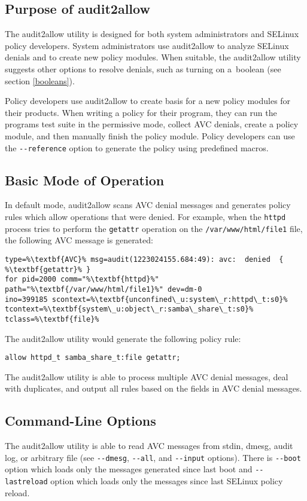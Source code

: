 \subsection{Purpose of audit2allow}
The audit2allow utility is designed for both system administrators and SELinux
policy developers. System administrators use audit2allow to analyze SELinux
denials and to create new policy modules. When suitable, the audit2allow utility
suggests other options to resolve denials, such as turning on a~boolean (see
section \ref{booleans}).

Policy developers use audit2allow to create basis for a new policy modules for
their products. When writing a policy for their program, they can run the
programs test suite in the permissive mode, collect AVC denials, create a policy
module, and then manually finish the policy module. Policy developers can use
the \texttt{-{}-reference} option to generate the policy using predefined
macros.

\subsection{Basic Mode of Operation}
In default mode, audit2allow scans AVC denial messages and generates policy
rules which allow operations that were denied. For example, when the
\texttt{httpd} process tries to perform the \texttt{getattr} operation on the
\texttt{/var/www/html/file1} file, the following AVC message is generated:
\begin{lstlisting}[escapechar=\%]
type=%\textbf{AVC}% msg=audit(1223024155.684:49): avc:  denied  { %\textbf{getattr}% }
for pid=2000 comm="%\textbf{httpd}%" path="%\textbf{/var/www/html/file1}%" dev=dm-0
ino=399185 scontext=%\textbf{unconfined\_u:system\_r:httpd\_t:s0}%
tcontext=%\textbf{system\_u:object\_r:samba\_share\_t:s0}% tclass=%\textbf{file}%
\end{lstlisting}
The audit2allow utility would generate the following policy rule:
\begin{lstlisting}
allow httpd_t samba_share_t:file getattr;
\end{lstlisting}
The audit2allow utility is able to process multiple AVC denial messages, deal
with duplicates, and output all rules based on the fields in AVC denial
messages.

\subsection{Command-Line Options}
The audit2allow utility is able to read AVC messages from stdin, dmesg, audit
log, or arbitrary file (see \texttt{-{}-dmesg}, \texttt{-{}-all}, and
\texttt{-{}-input} options). There is \texttt{-{}-boot} option which loads only
the messages generated since last boot and \texttt{-{}-lastreload} option which
loads only the messages since last SELinux policy reload.

